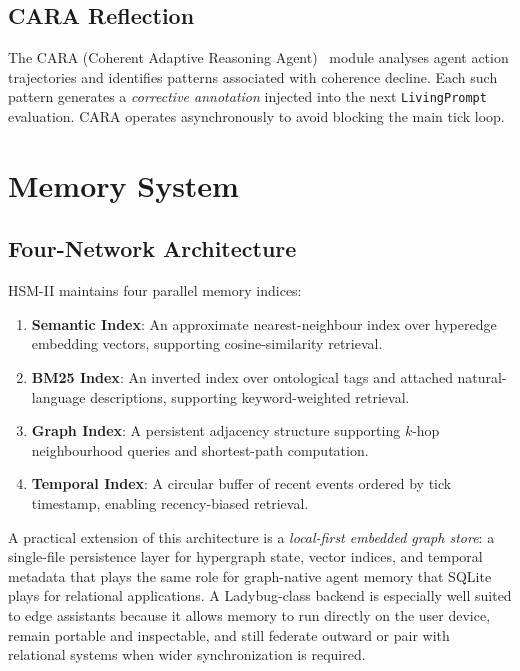 \documentclass[11pt]{article}
\begin{document}
\subsection{CARA Reflection}

The CARA (Coherent Adaptive Reasoning Agent)~\cite{latimer2025hindsight} module analyses agent action trajectories and
identifies patterns associated with coherence decline. Each such pattern
generates a \emph{corrective annotation} injected into the next \texttt{LivingPrompt}
evaluation. CARA operates asynchronously to avoid blocking the main tick loop.

\section{Memory System}
\nopagebreak[4]
\label{sec:memory}

\subsection{Four-Network Architecture}

HSM-II maintains four parallel memory indices:

\begin{enumerate}[noitemsep,topsep=4pt]
  \item \textbf{Semantic Index}: An approximate nearest-neighbour index over
        hyperedge embedding vectors, supporting cosine-similarity retrieval.
  \item \textbf{BM25 Index}: An inverted index over ontological tags and attached
        natural-language descriptions, supporting keyword-weighted retrieval.
  \item \textbf{Graph Index}: A persistent adjacency structure supporting
        $k$-hop neighbourhood queries and shortest-path computation.
  \item \textbf{Temporal Index}: A circular buffer of recent events ordered by
        tick timestamp, enabling recency-biased retrieval.
\end{enumerate}

A practical extension of this architecture is a \emph{local-first embedded graph
store}: a single-file persistence layer for hypergraph state, vector indices, and
temporal metadata that plays the same role for graph-native agent memory that
SQLite plays for relational applications. A Ladybug-class backend is especially
well suited to edge assistants because it allows memory to run directly on the
user device, remain portable and inspectable, and still federate outward or pair
with relational systems when wider synchronization is required.
\end{document}
